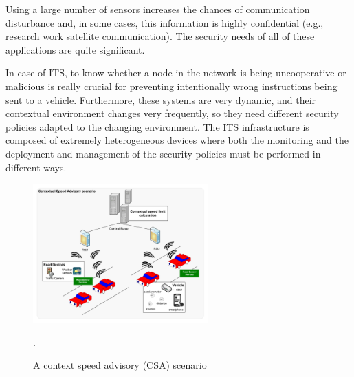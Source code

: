 \documentclass[12pt,a4paper,twoside]{report}
\begin{document}
Using a large number of sensors increases the chances of communication disturbance and, in some cases, this information is highly confidential (e.g., research work satellite communication). The security needs of all of these applications are quite significant. \par
In case of ITS, to know whether a node in the network is being uncooperative or malicious is really crucial for preventing intentionally wrong instructions being sent to a vehicle. Furthermore, these systems are very dynamic, and their contextual environment changes very frequently, so they need different security policies adapted to the changing environment. The ITS infrastructure is composed of extremely heterogeneous devices where both the monitoring and the deployment and management of the security policies must be performed in different ways.
\begin{figure}[ht]
	\begin{center}
  \includegraphics[width=0.6\textwidth,natwidth=652,natheight=510]{./figures/figure-01.png}
  \end{center}
  \caption{A context speed advisory (CSA) scenario \cite{Pinto;etal:2013}}.
  \label{fig:label}
\end{figure}
\end{document}

